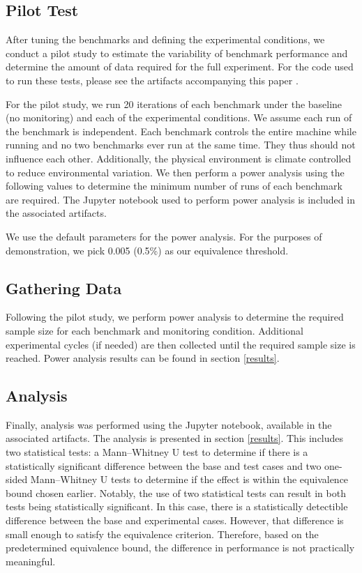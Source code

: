 \documentclass[conference]{IEEEtran}
\begin{document}
\subsection{Pilot Test}

After tuning the benchmarks and defining the experimental conditions, we conduct 
a pilot study to estimate the variability of benchmark performance and determine 
the amount of data required for the full experiment. For the code used 
to run these tests, please see the artifacts accompanying this paper\cite{HPCNexusLabImpactofMonitoringonHPCWorkloads} .

For the pilot study, we run 20 iterations of each benchmark under the baseline 
(no monitoring) and each of the experimental conditions. We assume each 
run of the benchmark is independent. Each benchmark controls the entire machine 
while running and no two benchmarks ever run at the same time. They thus should
not influence each other. Additionally, the physical environment is climate controlled to reduce environmental variation.
We then perform a 
power analysis using the following values to determine the minimum number of 
runs of each benchmark are required. The Jupyter notebook used to perform power 
analysis is included in the associated artifacts\cite{HPCNexusLabImpactofMonitoringonHPCWorkloads}.

We use the default parameters for the power analysis. For the purposes of
demonstration, we pick 0.005 (0.5\%) as our equivalence threshold.

\subsection{Gathering Data}


Following the pilot study, we perform power analysis to determine the required 
sample size for each benchmark and monitoring condition. Additional experimental 
cycles (if needed) are then collected until the required sample size is reached. 
Power analysis results can be found in section 
\ref{results}. 

\subsection{Analysis}

Finally, analysis was performed using the Jupyter notebook, available in the
associated artifacts\cite{HPCNexusLabImpactofMonitoringonHPCWorkloads}. The analysis is presented in section 
\ref{results}. This includes two statistical tests: a Mann--Whitney U test to 
determine if there is a statistically significant difference between the base 
and test cases and two one-sided Mann--Whitney U tests to determine if the effect is within the 
equivalence bound chosen earlier. Notably, the use of two statistical tests can result 
in both tests being statistically significant. In this case, there is a statistically
detectible difference between the base and experimental cases. However, that difference 
is small enough to satisfy the equivalence criterion. Therefore, based on the 
predetermined equivalence bound, the difference in performance is not practically 
meaningful.
\end{document}
